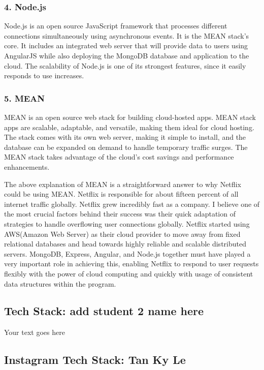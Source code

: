 \documentclass[a4paper, 11pt]{report}
\begin{document}
\subsubsection{4. Node.js}
Node.js is an open source JavaScript framework that processes different connections simultaneously using asynchronous events.\cite{isaac8}  It is the MEAN stack's core. It includes an integrated web server that will provide data to users using AngularJS while also deploying the MongoDB database and application to the cloud.\cite{isaac8} The scalability of Node.js is one of its strongest features, since it easily responds to use increases.

\subsubsection{5. MEAN}
MEAN is an open source web stack for building cloud-hosted apps. MEAN stack apps are scalable, adaptable, and versatile, making them ideal for cloud hosting.\cite{isaac8} The stack comes with its own web server, making it simple to install, and the database can be expanded on demand to handle temporary traffic surges. \cite{isaac8} The MEAN stack takes advantage of the cloud's cost savings and performance enhancements.\cite{isaac8} 

The above explanation of MEAN is a straightforward answer to why Netflix could be using MEAN. Netflix is responsible for about fifteen percent of all internet traffic globally. Netflix grew incredibly fast as a company. I believe one of the most crucial factors behind their success was their quick adaptation of strategies to handle overflowing user connections globally. Netflix started using AWS(Amazon Web Server) as their cloud provider to move away from fixed relational databases and head towards highly reliable and scalable distributed servers.\cite{isaac11}  MongoDB, Express, Angular, and Node.js together must have played a very important role in achieving this, enabling Netflix to respond to user requests flexibly with the power of cloud computing and quickly with usage of consistent data structures within the program.


\subsection{Tech Stack: add student 2 name here}

Your text goes here

\subsection{ Instagram Tech Stack: Tan Ky Le}
\end{document}
